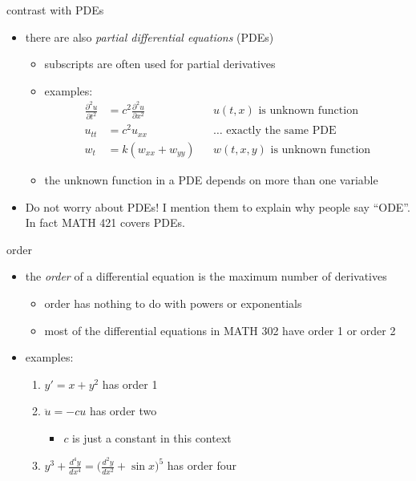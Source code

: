 \documentclass{beamer}
\begin{document}
\begin{frame}{contrast with PDEs}

\begin{itemize}
\item there are also \emph{partial differential equations} (PDEs)
    \begin{itemize}
    \item subscripts are often used for partial derivatives
    \item examples:
\begin{align*}
\frac{\partial^2 u}{\partial t^2} &= c^2 \frac{\partial^2 u}{\partial x^2} && u(t,x) \text{ is unknown function} \\
u_{tt} &= c^2 u_{xx} && \dots \text{ exactly the same PDE} \\
w_t &= k(w_{xx} + w_{yy}) && w(t,x,y) \text{ is unknown function}
\end{align*}
    \item the unknown function in a PDE depends on more than one variable
    \end{itemize}

\vspace{3mm}
\item Do not worry about PDEs!  I mention them to explain why people say ``ODE''.  In fact MATH 421 covers PDEs.
\end{itemize}
\end{frame}

\begin{frame}{order}

\begin{itemize}
\item the \emph{order} of a differential equation is the maximum number of derivatives
    \begin{itemize}
    \item order has nothing to do with powers or exponentials
    \item most of the differential equations in MATH 302 have order 1 or order 2
    \end{itemize}
\item examples:
    \begin{enumerate}
    \item $y' = x + y^2$ has order 1
    \item $\ddot u = - c u$ has order two
        \begin{itemize}
        \item $c$ is just a constant in this context
        \end{itemize}
    \item $y^3 + \frac{d^4 y}{dx^4} = \big(\frac{d^2 y}{dx^2} + \sin x\big)^5$ has order four
    \end{enumerate}
\end{itemize}
\end{frame}
\end{document}
